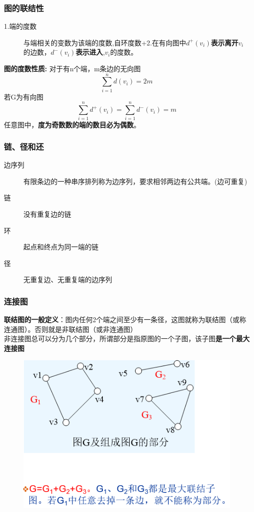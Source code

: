 \subsubsection{图的联结性}
\begin{description}
	\item[1.端的度数] 与端相关的变数为该端的度数,自环度数+2.在有向图中\textbf{$ d^+(v_i) $表示离开}$ v_i $的边数，\textbf{$ d^-(v_i) $表示进入},$ v_i $的度数。
\end{description}
\textbf{图的度数性质:}
对于有n个端，m条边的无向图
\begin{equation}\label{key}
\sum_{i=1}^{n}d(v_i) = 2m
\end{equation}
若G为有向图
\begin{equation}\label{key}
\sum_{i=1}^{n}d^+(v_i) = \sum_{i=1}^{n}d^-(v_i) = m
\end{equation}
任意图中，\textbf{度为奇数数的端的数目必为偶数}。
\subsubsection{链、径和还}
\begin{description}
	\item[边序列] 有限条边的一种串序排列称为边序列，要求相邻两边有公共端。(边可重复)
	\item [链] 没有重复边的链
	\item [环] 起点和终点为同一端的链
	\item[径] 无重复边、无重复端的边序列
\end{description}
\subsubsection{连接图}
\textbf{联结图的一般定义}：图内任何2个端之间至少有一条径，这图就称为联结图（或称连通图）。否则就是非联结图（或非连通图）\\
非连接图总可以分为几个部分，所谓部分是指原图的一个子图，该子图\textbf{是一个最大连接图}
\begin{figure}[H]
	\centering
	\includegraphics[width=0.7\linewidth]{screenshot003}
	\caption{}
	\label{fig:screenshot003}
\end{figure}
